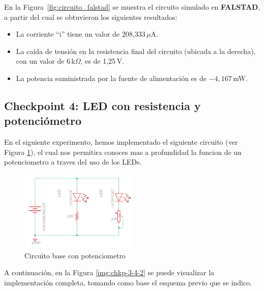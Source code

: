 \documentclass{article}
\begin{document}
En la Figura~\ref{fig:circuito_falstad} se muestra el circuito simulado en \textbf{FALSTAD}, a partir del cual se obtuvieron los siguientes resultados:

\begin{itemize}
    \item La corriente ``i'' tiene un valor de 208{,}333\,$\mu$A.
    \item La caída de tensión en la resistencia final del circuito (ubicada a la derecha), con un valor de 6\,k$\Omega$, es de 1{,}25\,V.
    \item La potencia suministrada por la fuente de alimentación es de $-4{,}167$\,mW.
\end{itemize}

\subsection{Checkpoint 4: LED con resistencia y potenciómetro}
En el siguiente experimento, hemos implementado el siguiente circuito (ver Figura \ref{fig:circuito_chkp_4}), el cual nos permitira conoces mas a profundidad la funcion de un potenciometro a traves del uso de los LEDs.

\begin{figure}[H]
    \centering
    \includegraphics[width=0.50\textwidth]{./img/Circuito-potenciometro.png}
    \caption{Circuito base con potenciometro}
    \label{fig:circuito_chkp_4}
\end{figure}

A continuación, en la Figura \ref{img:chkp-3-4-2} se puede visualizar la implementación completa, tomando como base el esquema previo que se indico.
\end{document}
